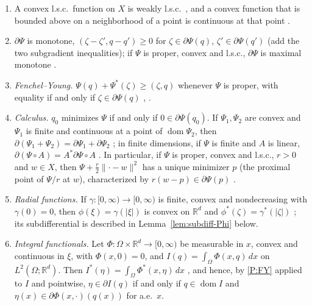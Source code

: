 \documentclass[11pt]{amsart}
\theoremstyle{definition}
\theoremstyle{remark}
\numberwithin{equation}{section}
\newcommand{\R}{\mathbb{R}}
\newcommand{\dx}{\,dx}
\newcommand{\abs}[1]{\lvert #1\rvert}
\newcommand{\norm}[1]{\lVert #1\rVert}
\DeclareMathOperator{\dom}{dom}
\begin{document}
\begin{enumerate}[label=(P\arabic*),leftmargin=2.6em]
\item\label{P:wlsc} A convex l.s.c.\ function on $X$ is weakly l.s.c.\ \cite[Ch.~I, Cor.~2.2]{EkelandTemam1999}, %
and a convex function that is bounded above on a neighborhood of a point is continuous at that point \cite[Ch.~I, \S2]{EkelandTemam1999}. %
\item\label{P:mono} $\partial\Psi$ is monotone, $(\zeta-\zeta',q-q')\ge0$ for $\zeta\in\partial\Psi(q)$, $\zeta'\in\partial\Psi(q')$ (add the two subgradient inequalities); if $\Psi$ is proper, convex and l.s.c., $\partial\Psi$ is maximal monotone \cite{Rockafellar1970max}.
\item\label{P:FY} \emph{Fenchel--Young.} $\Psi(q)+\Psi^*(\zeta)\ge(\zeta,q)$ whenever $\Psi$ is proper, with equality if and only if $\zeta\in\partial\Psi(q)$ \cite[Ch.~I, Prop.~5.1]{EkelandTemam1999}, \cite[Thm.~23.5]{Rockafellar1970}. %
\item\label{P:calc} \emph{Calculus.} $q_0$ minimizes $\Psi$ if and only if $0\in\partial\Psi(q_0)$. If $\Psi_1,\Psi_2$ are convex and $\Psi_1$ is finite and continuous at a point of $\dom\Psi_2$, then $\partial(\Psi_1+\Psi_2)=\partial\Psi_1+\partial\Psi_2$ \cite[Ch.~I, Prop.~5.6]{EkelandTemam1999}; in finite dimensions, if $\Psi$ is finite and $A$ is linear, $\partial(\Psi\circ A)=A^*\partial\Psi\circ A$ \cite[Thm.~23.9]{Rockafellar1970}. %
In particular, if $\Psi$ is proper, convex and l.s.c., $r>0$ and $w\in X$, then $\Psi+\frac r2\norm{\cdot-w}^2$ has a unique minimizer $p$ (the proximal point of $\Psi/r$ at $w$), characterized by $r(w-p)\in\partial\Psi(p)$ \cite[\S12.4 and Ch.~16]{BauschkeCombettes2017}. %
\item\label{P:radial} \emph{Radial functions.} If $\gamma\colon[0,\infty)\to[0,\infty)$ is finite, convex and nondecreasing with $\gamma(0)=0$, then $\phi(\xi)=\gamma(\abs\xi)$ is convex on $\R^d$ and $\phi^*(\zeta)=\gamma^*(\abs\zeta)$ \cite[Thm.~15.3]{Rockafellar1970}; its subdifferential is described in Lemma~\ref{lem:subdiff-Phi} below. %
\item\label{P:integral} \emph{Integral functionals.} Let $\Phi\colon\Omega\times\R^d\to[0,\infty)$ be measurable in $x$, convex and continuous in $\xi$, with $\Phi(x,0)=0$, and $I(q)=\int_\Omega\Phi(x,q)\dx$ on $L^2(\Omega;\R^d)$. Then $I^*(\eta)=\int_\Omega\Phi^*(x,\eta)\dx$ \cite[Thm.~2]{Rockafellar1968}, %
and hence, by \ref{P:FY} applied to $I$ and pointwise, $\eta\in\partial I(q)$ if and only if $q\in\dom I$ and $\eta(x)\in\partial\Phi(x,\cdot)(q(x))$ for a.e.\ $x$.
\end{enumerate}
\end{document}
